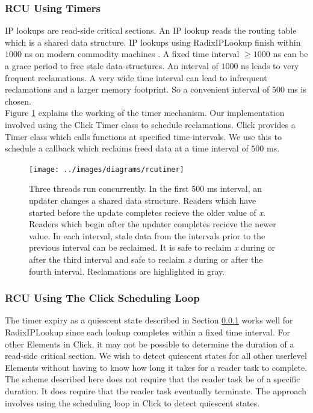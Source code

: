 \documentclass[a4paper,marginparwidth=50pt,marginparsep=10pt]{article}
\begin{document}
\subsubsection{RCU Using Timers}
\label{sec:rcutimers}
IP lookups are read-side critical sections. An IP lookup reads the routing table which is a shared data structure. IP lookups using RadixIPLookup finish within $1000$ ns on modern commodity machines \cite{lookuptime}. A fixed time interval $\ge 1000$ ns can be a grace period to free stale data-structures. An interval of $1000$ ns leads to very frequent reclamations. A very wide time interval can lead to infrequent reclamations and a larger memory footprint. So a convenient interval of $500$ ms is chosen.\\ 

Figure \ref{fig:rcutimer} explains the working of the timer mechanism. Our implementation involved using the Click Timer class to schedule reclamations. Click provides a Timer class which calls functions at specified time-intervals. We use this to schedule a callback which reclaims freed data at a time interval of $500$ ms.
\begin{figure}[float=tph]
\begin{center}
\texttt{[image: ../images/diagrams/rcutimer]}
\caption{ Three threads run concurrently. In the first 500 ms interval, an updater changes a shared data structure. Readers which have started before the update completes recieve the older value of \emph{x}. Readers which begin after the updater completes recieve the newer value. In each interval, stale data from the intervals prior to the previous interval can be reclaimed. It is safe to reclaim \emph{x} during or after the third interval and safe to reclaim \emph{z} during or after the fourth interval. Reclamations are highlighted in gray.
}
\label{fig:rcutimer}
\end{center}
\end{figure}

\subsubsection{RCU Using The Click Scheduling Loop}
\label{rcuschedloop}

The timer expiry as a quiescent state described in Section \ref{sec:rcutimers} works well for RadixIPLookup since each lookup completes within a fixed time interval. For other Elements in Click, it may not be possible to determine the duration of a read-side critical section. We wish to detect quiescent states for all other userlevel Elements without having to know how long it takes for a reader task to complete. The scheme described here does not require that the reader task be of a specific duration. It does require that the reader task eventually terminate. The approach involves using the scheduling loop in Click to detect quiescent states. 
\end{document}
